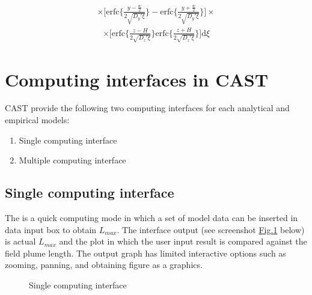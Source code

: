 \documentclass[letterpaper,10pt,english]{sphinxmanual}
\begin{document}
\begin{equation*}
\begin{split}\times \Bigg[\text{erfc}\Bigg\{\frac{y-\frac{w}{2}}{2\sqrt{D_y'\xi}}
\Bigg\}-\text{erfc}\Bigg\{\frac{y+\frac{w}{2}}{2\sqrt{D_y'\xi}}
\Bigg\}\Bigg]\times\end{split}
\end{equation*}\begin{equation*}
\begin{split}\times \Bigg[\text{erfc}\Bigg\{\frac{z-H}{2\sqrt{D_z'\xi}}\Bigg\}
\text{erfc}\Bigg\{\frac{z+H}{2\sqrt{D_z'\xi}} 
\Bigg\}\Bigg]\text{d}\xi\end{split}
\end{equation*}

\section{Computing interfaces in CAST}
\label{\detokenize{contents/toolbox/an_model/an_model:computing-interfaces-in-cast}}
\sphinxAtStartPar
CAST provide the following two computing interfaces for each analytical and empirical models:
\begin{enumerate}
%
\item {} 
\sphinxAtStartPar
Single computing interface

\item {} 
\sphinxAtStartPar
Multiple computing interface

\end{enumerate}


\subsection{Single computing interface}
\label{\detokenize{contents/toolbox/an_model/an_model:single-computing-interface}}
\sphinxAtStartPar
The  is a quick computing mode in which a set of model data can be inserted in data input box to obtain \(L_{max}\). The interface output (see screenshot \hyperref[\detokenize{contents/toolbox/an_model/an_model:scm}]{Fig.\@ \ref{\detokenize{contents/toolbox/an_model/an_model:scm}}} below) is actual \(L_{max}\) and the plot in which the user input result is compared against the field plume length. The output graph has limited interactive options\sphinxhyphen{} such as zooming, panning, and obtaining figure as a  graphics.

\begin{figure}[htbp]
\centering
\capstart

\noindent{}
\caption{Single computing interface}\label{\detokenize{contents/toolbox/an_model/an_model:scm}}\end{figure}
\end{document}
